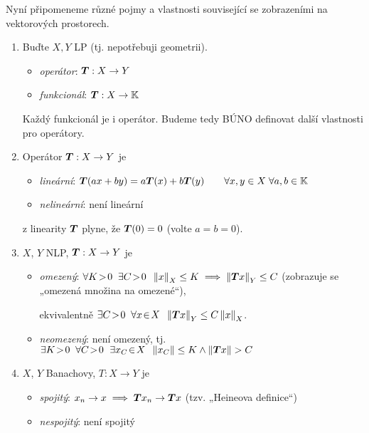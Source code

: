 \phantom{.}

Nyní připomeneme různé pojmy a vlastnosti související se zobrazeními na vektorových prostorech.
\begin{enumerate}
    \item Buďte $X,Y$ LP (tj. nepotřebuji geometrii).
    \begin{itemize}
        \item \emph{operátor}: $\boldsymbol{T}: X \to Y$
        \item \emph{funkcionál}: $\boldsymbol{T}: X \to \mathbb{K}$
    \end{itemize}
    Každý funkcionál je i operátor. Budeme tedy BÚNO definovat další vlastnosti pro operátory.
    
    \item Operátor $\boldsymbol{T}: X \to Y$ je
    \begin{itemize}
        \item \emph{lineární}: $\boldsymbol{T}(ax + by) = a \boldsymbol{T}(x) + b \boldsymbol{T}(y) \hspace{2em} \forall x,y \in X \; \forall a,b \in \mathbb{K}$
        \item \emph{nelineární}: není lineární
    \end{itemize}
    
    \Poznamka z linearity $\boldsymbol{T}$ plyne, že $\boldsymbol{T}(0) = 0$ (volte $a=b=0$).
    
    \item $X$, $Y$ NLP, $\boldsymbol{T}: X \to Y$ je
    \begin{itemize}
        \item \emph{omezený}: $\forall K\!>\!0 \;\; \exists C\!>\!0 \;\; \left\lVert x\right\rVert_X \leq K \implies \left\lVert\boldsymbol{T}x\right\rVert_Y \leq C$ (zobrazuje se „omezená množina na omezené“),
        
        ekvivalentně $\exists C\!>\!0 \;\; \forall x \!\in\! X \;\; \left\lVert\boldsymbol{T}x\right\rVert_Y \leq C \left\lVert x\right\rVert_X $.
        
        \item \emph{neomezený}: není omezený, tj. $\exists K\!>\!0 \;\; \forall C\!>\!0 \;\ \exists x_C \!\in\! X \;\; \norm{x_C} \leq K \wedge \norm{\map Tx} > C$
    \end{itemize}
    
    \item $X$, $Y$ Banachovy, $T: X \to Y$ je
    \begin{itemize}
        \item \emph{spojitý}: $x_n \to x \implies \boldsymbol{T} x_n \to \boldsymbol{T} x$ (tzv. „Heineova definice“)
        
        \item \emph{nespojitý}: není spojitý
    \end{itemize}
\end{enumerate}

